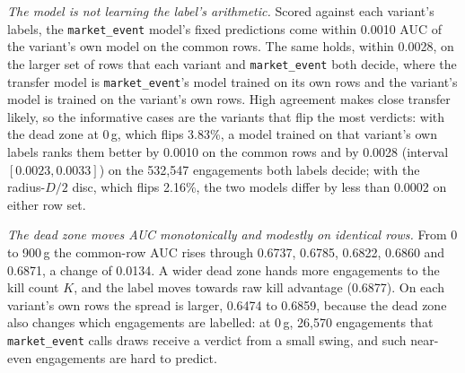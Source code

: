 \emph{The model is not learning the label's arithmetic.} Scored against each variant's labels, the
\texttt{market\_event} model's fixed predictions come within 0.0010 AUC of the variant's own model on
the common rows. The same holds, within 0.0028, on the larger set of rows that each variant and
\texttt{market\_event} both decide, where the transfer model is \texttt{market\_event}'s model trained
on its own rows and the variant's model is trained on the variant's own rows. High agreement makes close transfer
likely, so the informative cases are the variants that flip the most verdicts: with the dead zone at
0\,g, which flips 3.83\%, a model trained on that variant's own labels ranks them better by 0.0010 on the
common rows and by 0.0028 (interval $[0.0023, 0.0033]$) on the 532,547 engagements both labels decide;
with the radius-$D/2$ disc, which flips 2.16\%, the two models differ by less than 0.0002 on either row set.

\emph{The dead zone moves AUC monotonically and modestly on identical rows.} From 0 to 900\,g the
common-row AUC rises through 0.6737, 0.6785, 0.6822, 0.6860 and 0.6871, a change of 0.0134. A wider dead
zone hands more engagements to the kill count $K$, and the label moves towards raw kill advantage
(0.6877). On each variant's own rows the spread is larger, 0.6474 to 0.6859, because the dead zone
also changes which engagements are labelled: at 0\,g, 26,570 engagements that \texttt{market\_event}
calls draws receive a verdict from a small swing, and such near-even engagements are hard to predict.

